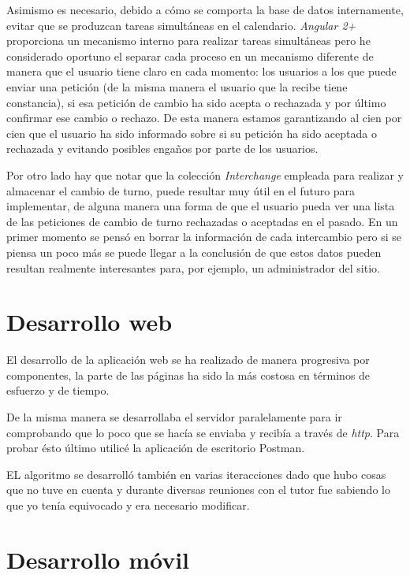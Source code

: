  Asimismo es necesario, debido a cómo se comporta la base de datos internamente, evitar que se produzcan tareas simultáneas en el calendario. \emph{Angular 2+} proporciona un mecanismo interno para realizar tareas simultáneas pero he considerado oportuno el separar cada proceso en un mecanismo diferente de manera que el usuario tiene claro en cada momento: los usuarios a los que puede enviar una petición (de la misma manera el usuario que la recibe tiene constancia), si esa petición de cambio ha sido acepta o rechazada y por último confirmar ese cambio o rechazo. De esta manera estamos garantizando al cien por cien que el usuario ha sido informado sobre si su petición ha sido aceptada o rechazada y evitando posibles engaños por parte de los usuarios.
 
 Por otro lado hay que notar que la colección \emph{Interchange} empleada para realizar y almacenar el cambio de turno, puede resultar muy útil en el futuro para implementar, de alguna manera una forma de que el usuario pueda ver una lista de las peticiones de cambio de turno rechazadas o aceptadas en el pasado. En un primer momento se pensó en borrar la información de cada intercambio pero si se piensa un poco más se puede llegar a la conclusión de que estos datos pueden resultan realmente interesantes para, por ejemplo, un administrador del sitio. 
 

   
   \section{Desarrollo web}\label{dweb}
   
   El desarrollo de la aplicación web se ha realizado de manera progresiva por componentes, la parte de las páginas ha sido la más costosa en términos de esfuerzo y de tiempo.
   
  De la misma manera se desarrollaba el servidor paralelamente para ir comprobando que lo poco que se hacía se enviaba y recibía a través de \emph{http}. Para probar ésto último utilicé la aplicación de escritorio Postman. 
  
  EL algoritmo se desarrolló también en varias iteracciones dado que hubo cosas que no tuve en cuenta y durante diversas reuniones con el tutor fue sabiendo lo que yo tenía equivocado y era necesario modificar. 
  
   \section{Desarrollo móvil}\label{dapp}
   
